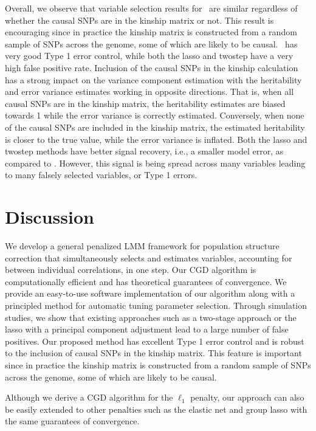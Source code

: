 Overall, we observe that variable selection results for \ggmix ~are similar regardless of whether the causal SNPs are in the kinship matrix or not. 
This result is encouraging since in practice the kinship matrix is constructed from a random sample of SNPs across the genome, some of which are likely to be causal. 
\ggmix ~has very good Type 1 error control, while both the lasso and twostep have a very high false positive rate. 
Inclusion of the causal SNPs in the kinship calculation has a strong impact on the variance component estimation with the heritability and error variance estimates working in opposite directions. 
That is, when all causal SNPs are in the kinship matrix, the heritability estimates are biased towards 1 while the error variance is correctly estimated. 
Conversely, when none of the causal SNPs are included in the kinship matrix, the estimated heritability is closer to the true value, while the error variance is inflated. 
Both the lasso and twostep methods have better signal recovery, i.e., a smaller model error, as compared to \ggmix. 
However, this signal is being spread across many variables leading to many falsely selected variables, or Type 1 errors. 

\section{Discussion}

We develop a general penalized LMM framework for population structure correction that simultaneously selects and estimates variables, accounting for between individual correlations, in one step. 
Our CGD algorithm is computationally efficient and has theoretical guarantees of convergence. 
We provide an easy-to-use software implementation of our algorithm along with a principled method for automatic tuning parameter selection. 
Through simulation studies, we show that existing approaches such as a two-stage approach or the lasso with a principal component adjustment lead to a large number of false positives.     
Our proposed method has excellent Type 1 error control and is robust to the inclusion of causal SNPs in the kinship matrix. This feature is important since in practice the kinship matrix is constructed from a random sample of SNPs across the genome, some of which are likely to be causal. 

Although we derive a CGD algorithm for the $\ell_1$ penalty, our approach can also be easily extended to other penalties such as the elastic net and group lasso with the same guarantees of convergence. 


